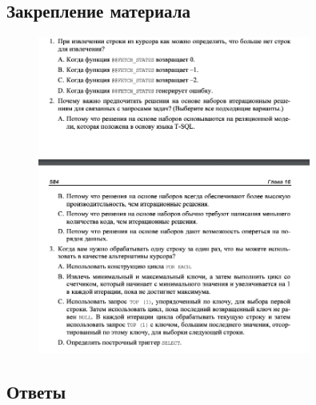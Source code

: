 \subsection*{Закрепление материала}

\begin{figure}[h!]
	\begin{center}
		\includegraphics[width=0.8\textwidth]{img/zakrep46.png}
	\end{center}
	\captionsetup{justification=centering}
\end{figure}
\newpage

\subsection*{Ответы}

